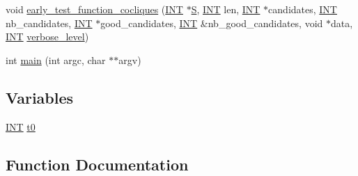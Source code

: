 \begin{DoxyCompactItemize}
\item 
void \mbox{\hyperlink{all__cliques_8_c_a76a03ce559765dd64a7e21f553acb888}{early\+\_\+test\+\_\+function\+\_\+cocliques}} (\mbox{\hyperlink{galois_8h_a09fddde158a3a20bd2dcadb609de11dc}{I\+NT}} $\ast$\mbox{\hyperlink{simeon_8_c_adab47f8243f1b5a2c31df2535d6b37d0}{S}}, \mbox{\hyperlink{galois_8h_a09fddde158a3a20bd2dcadb609de11dc}{I\+NT}} len, \mbox{\hyperlink{galois_8h_a09fddde158a3a20bd2dcadb609de11dc}{I\+NT}} $\ast$candidates, \mbox{\hyperlink{galois_8h_a09fddde158a3a20bd2dcadb609de11dc}{I\+NT}} nb\+\_\+candidates, \mbox{\hyperlink{galois_8h_a09fddde158a3a20bd2dcadb609de11dc}{I\+NT}} $\ast$good\+\_\+candidates, \mbox{\hyperlink{galois_8h_a09fddde158a3a20bd2dcadb609de11dc}{I\+NT}} \&nb\+\_\+good\+\_\+candidates, void $\ast$data, \mbox{\hyperlink{galois_8h_a09fddde158a3a20bd2dcadb609de11dc}{I\+NT}} \mbox{\hyperlink{simeon_8_c_a818073fbcc2f439e7c56952f67386122}{verbose\+\_\+level}})
\item 
int \mbox{\hyperlink{all__cliques_8_c_a3c04138a5bfe5d72780bb7e82a18e627}{main}} (int argc, char $\ast$$\ast$argv)
\end{DoxyCompactItemize}
\subsection*{Variables}
\begin{DoxyCompactItemize}
\item 
\mbox{\hyperlink{galois_8h_a09fddde158a3a20bd2dcadb609de11dc}{I\+NT}} \mbox{\hyperlink{all__cliques_8_c_a4268f4fe222ffb119218a0199f5e1904}{t0}}
\end{DoxyCompactItemize}


\subsection{Function Documentation}
\mbox{\label{all__cliques_8_c_a09f78bde7f687bf1bae36dd883bb182a}} 
